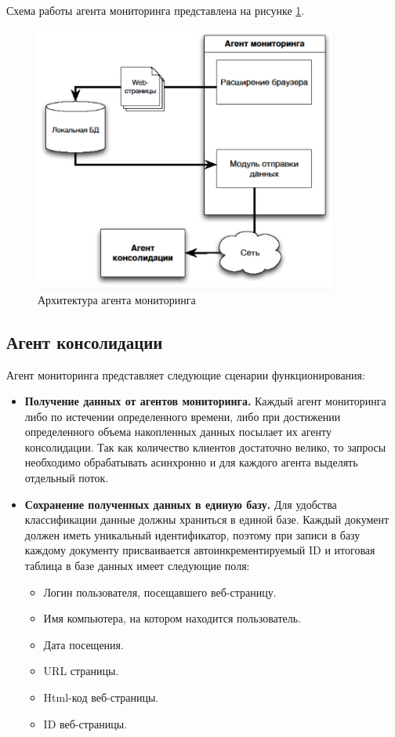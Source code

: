 \documentclass[russian, utf8, emptystyle]{eskdtext}
\begin{document}
Схема работы агента мониторинга представлена на рисунке \ref{fig:monitorint_agent}.
\begin{figure}[h]
	\begin{center}
		\includegraphics[width=10cm]{pic/agent1.png}
		\caption{Архитектура агента мониторинга}
		\label{fig:monitorint_agent}
	\end{center}
\end{figure}

\subsection {Агент консолидации}

Агент мониторинга представляет следующие сценарии функционирования:
\begin{itemize}
	\item {\bf Получение данных от агентов мониторинга.} Каждый агент мониторинга либо по истечении определенного времени, либо при достижении определенного объема накопленных данных посылает их агенту консолидации. Так как количество клиентов достаточно велико, то запросы необходимо обрабатывать асинхронно и для каждого агента выделять отдельный поток.
	\item {\bf Сохранение полученных данных в единую базу.} Для удобства классификации данные должны храниться в единой базе. Каждый документ должен иметь уникальный идентификатор, поэтому при записи в базу каждому документу присваивается автоинкрементируемый ID и итоговая таблица в базе данных имеет следующие поля:
	\begin{itemize}
	\item Логин пользователя, посещавшего веб-страницу.
	\item Имя компьютера, на котором находится пользователь.
	\item Дата посещения.
	\item URL страницы.
	\item Html-код веб-страницы.
	\item ID веб-страницы.
\end{itemize}
	
\end{itemize}
\end{document}
